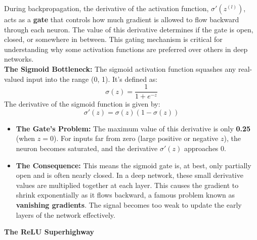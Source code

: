 \documentclass{article}
\begin{document}
\begin{tcolorbox}[
    colback=blue!5!white,
    colframe=blue!50!black,
    title={\textbf{sensitivity of the activation function}},
    fonttitle=\bfseries,
    sharp corners,
    boxrule=1pt,
    left=6pt,
    right=6pt,
    top=6pt,
    bottom=6pt
]
During backpropagation, the derivative of the activation function, $\sigma'(z^{(l)})$, acts as a \textbf{gate} that controls how much gradient is allowed to flow backward through each neuron. The value of this derivative determines if the gate is open, closed, or somewhere in between. This gating mechanism is critical for understanding why some activation functions are preferred over others in deep networks.\\

\textbf{The Sigmoid Bottleneck:}
The sigmoid activation function squashes any real-valued input into the range (0, 1). It's defined as:
\begin{equation}
    \sigma(z) = \frac{1}{1 + e^{-z}}
\end{equation}
The derivative of the sigmoid function is given by:
\begin{equation}
    \sigma'(z) = \sigma(z)(1 - \sigma(z))
\end{equation}
\begin{itemize}
    \item \textbf{The Gate's Problem:} The maximum value of this derivative is only \textbf{0.25} (when $z=0$). For inputs far from zero (large positive or negative $z$), the neuron becomes saturated, and the derivative $\sigma'(z)$ approaches 0.
    \item \textbf{The Consequence:} This means the sigmoid gate is, at best, only partially open and is often nearly closed. In a deep network, these small derivative values are multiplied together at each layer. This causes the gradient to shrink exponentially as it flows backward, a famous problem known as \textbf{vanishing gradients}. The signal becomes too weak to update the early layers of the network effectively.
\end{itemize}

\textbf{The ReLU Superhighway}


\end{tcolorbox}
\end{document}
